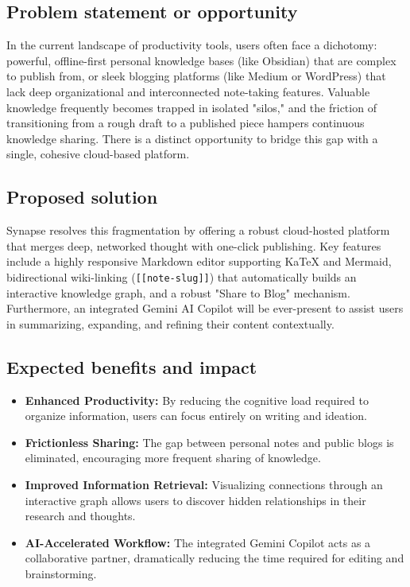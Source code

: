 \documentclass[12pt, a4paper]{article}
\begin{document}
\subsection{Problem statement or opportunity}
In the current landscape of productivity tools, users often face a dichotomy: powerful, offline-first personal knowledge bases (like Obsidian) that are complex to publish from, or sleek blogging platforms (like Medium or WordPress) that lack deep organizational and interconnected note-taking features. Valuable knowledge frequently becomes trapped in isolated "silos," and the friction of transitioning from a rough draft to a published piece hampers continuous knowledge sharing. There is a distinct opportunity to bridge this gap with a single, cohesive cloud-based platform.

\subsection{Proposed solution}
Synapse resolves this fragmentation by offering a robust cloud-hosted platform that merges deep, networked thought with one-click publishing. Key features include a highly responsive Markdown editor supporting KaTeX and Mermaid, bidirectional wiki-linking (\texttt{[[note-slug]]}) that automatically builds an interactive knowledge graph, and a robust "Share to Blog" mechanism. Furthermore, an integrated Gemini AI Copilot will be ever-present to assist users in summarizing, expanding, and refining their content contextually.

\subsection{Expected benefits and impact}
\begin{itemize}[leftmargin=2em]
    \item \textbf{Enhanced Productivity:} By reducing the cognitive load required to organize information, users can focus entirely on writing and ideation.
    \item \textbf{Frictionless Sharing:} The gap between personal notes and public blogs is eliminated, encouraging more frequent sharing of knowledge.
    \item \textbf{Improved Information Retrieval:} Visualizing connections through an interactive graph allows users to discover hidden relationships in their research and thoughts.
    \item \textbf{AI-Accelerated Workflow:} The integrated Gemini Copilot acts as a collaborative partner, dramatically reducing the time required for editing and brainstorming.
\end{itemize}
\end{document}

